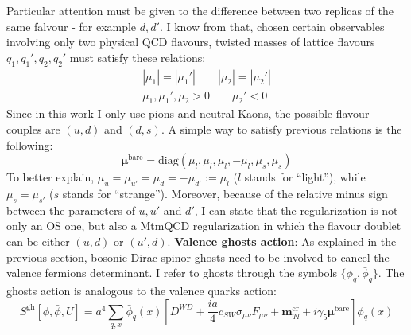 \documentclass[english, LaM, oneside, noexaminfo]{sapthesis}
\newcommand{\bare}{^{\text{bare}}}
\begin{document}
Particular attention must be given to the difference between two replicas of the same falvour - for example $d,d'$.
I know from \cite{FR2} that, chosen certain observables involving only two physical QCD flavours, twisted masses of lattice flavours $q_1,q_1',q_2,q_2'$ must satisfy these relations:
\begin{equation*}
    \begin{gathered}
        |\mu_1| = |\mu_1 '| \qquad |\mu_2| = |\mu_2 '| \\
        \mu_1, \mu_1 ', \mu_2 > 0 \qquad \mu_2 '<0
    \end{gathered}
\end{equation*}
Since in this work I only use pions and neutral Kaons, the possible flavour couples are $(u,d)$ and $(d,s)$.
A simple way to satisfy previous relations is the following:
\begin{equation*}
    \boldsymbol{\mu}\bare = \text{diag}\left(\mu_l,\mu_l,\mu_l,-\mu_l,\mu_s,\mu_s\right)
\end{equation*}
To better explain, $\mu_u = \mu_{u'} = \mu_d = -\mu_{d'} := \mu_l$ ($l$ stands for ``light''), while $\mu_s = \mu_{s'}$ ($s$ stands for ``strange'').
Moreover, because of the relative minus sign between the parameters of $u,u'$ and $d'$, I can state that the regularization is not only an OS one, but also a MtmQCD regularization in which the flavour doublet can be either $(u,d)$ or $(u',d)$.
\newline\newline
{\bf Valence ghosts action}:
As explained in the previous section, bosonic Dirac-spinor ghosts need to be involved to cancel the valence fermions determinant.
I refer to ghosts through the symbols $\{\phi_q,\bar\phi_q\}$.
The ghosts action is analogous to the valence quarks action:
\begin{equation}\label{eq:ghost-action}
    S^{\text{gh}}[\phi, \bar\phi, U] = a^4 \sum_{q,x} \bar \phi_q (x) \left[ D^{WD} + \frac{ia}{4}c_{SW}\sigma_{\mu\nu}\hat F_{\mu\nu} + \boldsymbol{m}^\text{cr}_{qq} + i\gamma_5\boldsymbol{\mu}\bare \right] \phi_q (x)
\end{equation}
\end{document}
